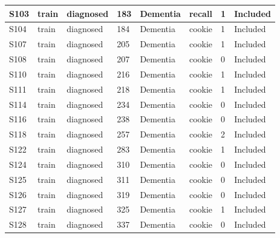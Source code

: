 \begin{center}
\begin{longtable}{|l|l|l|l|l|l|l|l|}
S103           & train                 & diagnosed         & 183     & Dementia       & recall          & 1            & Included      \\ \hline
S104           & train                 & diagnosed         & 184     & Dementia       & cookie          & 1            & Included      \\ \hline
S107           & train                 & diagnosed         & 205     & Dementia       & cookie          & 1            & Included      \\ \hline
S108           & train                 & diagnosed         & 207     & Dementia       & cookie          & 0            & Included      \\ \hline
S110           & train                 & diagnosed         & 216     & Dementia       & cookie          & 1            & Included      \\ \hline
S111           & train                 & diagnosed         & 218     & Dementia       & cookie          & 1            & Included      \\ \hline
S114           & train                 & diagnosed         & 234     & Dementia       & cookie          & 0            & Included      \\ \hline
S116           & train                 & diagnosed         & 238     & Dementia       & cookie          & 0            & Included      \\ \hline
S118           & train                 & diagnosed         & 257     & Dementia       & cookie          & 2            & Included      \\ \hline
S122           & train                 & diagnosed         & 283     & Dementia       & cookie          & 1            & Included      \\ \hline
S124           & train                 & diagnosed         & 310     & Dementia       & cookie          & 0            & Included      \\ \hline
S125           & train                 & diagnosed         & 311     & Dementia       & cookie          & 0            & Included      \\ \hline
S126           & train                 & diagnosed         & 319     & Dementia       & cookie          & 0            & Included      \\ \hline
S127           & train                 & diagnosed         & 325     & Dementia       & cookie          & 1            & Included      \\ \hline
S128           & train                 & diagnosed         & 337     & Dementia       & cookie          & 0            & Included      \\ \hline

\end{longtable}
\end{center}
